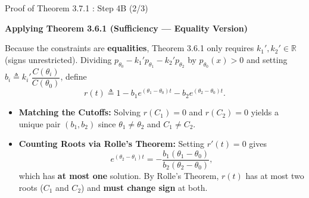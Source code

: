 \documentclass[10pt, aspectratio=169, xcolor=dvipsnames]{beamer}
\newcommand{\lead}[1]{{\color{UniBlue}\bfseries #1}}
\begin{document}
\begin{frame}{Proof of Theorem 3.7.1 : Step 4B (2/3)}
    
    \lead{Applying Theorem 3.6.1 (Sufficiency --- Equality Version)}\\
    \vspace{0.2cm}
    
    \color{Slate}
    Because the constraints are \textbf{equalities}, Theorem 3.6.1 only requires $k_1', k_2' \in \mathbb{R}$ (signs unrestricted). Dividing $p_{\theta_0} - k_1' p_{\theta_1} - k_2' p_{\theta_2}$ by $p_{\theta_0}(x) > 0$ and setting $b_i \triangleq k_i' \dfrac{C(\theta_i)}{C(\theta_0)}$, define
    \[
        r(t) \triangleq 1 - b_1 e^{(\theta_1 - \theta_0) t} - b_2 e^{(\theta_2 - \theta_0) t}.
    \]
    
    \begin{itemize}
        \setlength\itemsep{6pt}
        \item[\textcolor{Teal}{\textbullet}] \textbf{Matching the Cutoffs:} Solving $r(C_1) = 0$ and $r(C_2) = 0$ yields a unique pair $(b_1, b_2)$ since $\theta_1 \neq \theta_2$ and $C_1 \neq C_2$.
        
        \item[\textcolor{Teal}{\textbullet}] \textbf{Counting Roots via Rolle's Theorem:} Setting $r'(t) = 0$ gives
        \[
            e^{(\theta_2 - \theta_1) t} = -\frac{b_1(\theta_1 - \theta_0)}{b_2(\theta_2 - \theta_0)},
        \]
        which has \textbf{at most one} solution. By Rolle's Theorem, $r(t)$ has at most two roots ($C_1$ and $C_2$) and \textbf{must change sign} at both.
    \end{itemize}
\end{frame}
\end{document}
